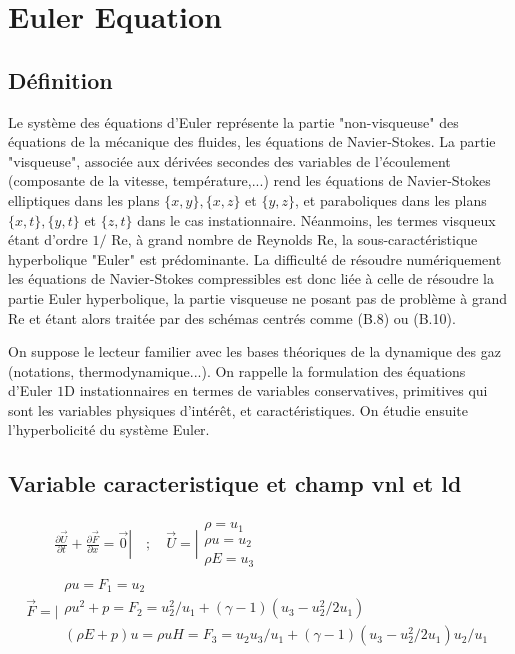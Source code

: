 \section {Euler Equation}
\subsection{Définition}

Le système des équations d'Euler représente la partie "non-visqueuse" des équations de la mécanique des fluides, les équations de Navier-Stokes. La partie "visqueuse", associée aux dérivées secondes des variables de l'écoulement (composante de la vitesse, température,...) rend les équations de Navier-Stokes elliptiques dans les plans $\{x, y\},\{x, z\}$ et $\{y, z\}$, et paraboliques dans les plans $\{x, t\},\{y, t\}$ et $\{z, t\}$ dans le cas instationnaire. Néanmoins, les termes visqueux étant d'ordre $1 /$ Re, à grand nombre de Reynolds Re, la sous-caractéristique hyperbolique "Euler" est prédominante. La difficulté de résoudre numériquement les équations de Navier-Stokes compressibles est donc liée à celle de résoudre la partie Euler hyperbolique, la partie visqueuse ne posant pas de problème à grand Re et étant alors traitée par des schémas centrés comme (B.8) ou (B.10).

On suppose le lecteur familier avec les bases théoriques de la dynamique des gaz (notations, thermodynamique...). On rappelle la formulation des équations d'Euler $1 \mathrm{D}$ instationnaires en termes de variables conservatives, primitives qui sont les variables physiques d'intérêt, et caractéristiques. On étudie ensuite l'hyperbolicité du système Euler.

\subsection{Variable caracteristique et  champ vnl et ld}
\begin{equation}
\begin{array}{r}
\qquad \frac{\partial \vec{U}}{\partial t}+\frac{\partial \vec{F}}{\partial x}=\overrightarrow{0}|\quad ; \quad \vec{U}=| \begin{array}{c}
\rho=u_{1} \\
\rho u=u_{2} \\
\rho E=u_{3}
\end{array} \\
\vec{F}=\mid \begin{aligned}
\rho u=F_{1}=u_{2} \\
\rho u^{2}+p=F_{2}=u_{2}^{2} / u_{1}+(\gamma-1)\left(u_{3}-u_{2}^{2} / 2 u_{1}\right) \\
(\rho E+p) u=\rho u H=F_{3}=u_{2} u_{3} / u_{1}+(\gamma-1)\left(u_{3}-u_{2}^{2} / 2 u_{1}\right) u_{2} / u_{1}
\end{aligned}
\end{array}
\end{equation}

